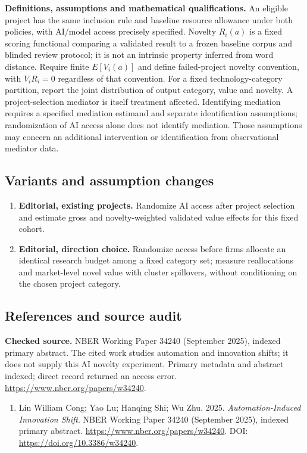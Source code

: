\documentclass[11pt,a4paper]{article}
\begin{document}
\textbf{Definitions, assumptions and mathematical qualifications.} An eligible project has the same inclusion rule and baseline resource allowance under both policies, with AI/model access precisely specified. Novelty \(R_i(a)\) is a fixed scoring functional comparing a validated result to a frozen baseline corpus and blinded review protocol; it is not an intrinsic property inferred from word distance. Require finite \(E[V_i(a)]\) and define failed-project novelty convention, with \(V_iR_i=0\) regardless of that convention. For a fixed technology-category partition, report the joint distribution of output category, value and novelty. A project-selection mediator is itself treatment affected. Identifying mediation requires a specified mediation estimand and separate identification assumptions; randomization of AI access alone does not identify mediation. Those assumptions may concern an additional intervention or identification from observational mediator data.
\subsection*{Variants and assumption changes}
\begin{enumerate}
\item \textbf{Editorial, existing projects.} Randomize AI access after project selection and estimate gross and novelty-weighted validated value effects for this fixed cohort.
\item \textbf{Editorial, direction choice.} Randomize access before firms allocate an identical research budget among a fixed category set; measure reallocations and market-level novel value with cluster spillovers, without conditioning on the chosen project category.
\end{enumerate}
\subsection*{References and source audit}
\textbf{Checked source.} NBER Working Paper 34240 (September 2025), indexed primary abstract. The cited work studies automation and innovation shifts; it does not supply this AI novelty experiment. Primary metadata and abstract indexed; direct record returned an access error. \url{https://www.nber.org/papers/w34240}.
\begin{enumerate}\raggedright
\item\hypertarget{definitions:source:30007701:1}{} Lin William Cong; Yao Lu; Hanqing Shi; Wu Zhu. 2025. \emph{Automation-Induced Innovation Shift}. NBER Working Paper 34240 (September 2025), indexed primary abstract.
\url{https://www.nber.org/papers/w34240}.
DOI: \url{https://doi.org/10.3386/w34240}.
\end{enumerate}
\end{document}
